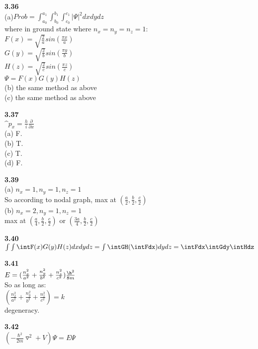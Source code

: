 \documentclass{article}
\begin{document}
\textbf{3.36}\\
(a)$Prob = \int_{a_0}^{a_1}\int_{b_0}^{b_1}\int_{c_0}^{c_1}|\Psi|^2dxdydz$\\
where in ground state where $n_x = n_y = n_z = 1$:\\
$F(x) = \sqrt{\frac{2}{a}}sin(\frac{\pi x}{a})$\\
$G(y) = \sqrt{\frac{2}{b}}sin(\frac{\pi y}{b})$\\
$H(z) = \sqrt{\frac{2}{c}}sin(\frac{\pi z}{c})$\\
$\Psi = F(x)G(y)H(z)$\\
(b) the same method as above\\
(c) the same method as above\\
\newline

\textbf{3.37}\\
$\^{p}_x = \frac{h}{i}\frac{\partial}{\partial x}$\\
(a) F.\\
(b) T.\\
(c) T.\\
(d) F.\\
\newline

\textbf{3.39}\\
(a) $n_x = 1, n_y = 1, n_z = 1$\\
So according to nodal graph, max at $(\frac{a}{2}, \frac{b}{2}, \frac{c}{2})$\\
(b) $n_x = 2, n_y = 1, n_z = 1$\\
max at $(\frac{a}{4}, \frac{b}{2}, \frac{c}{2})$ or $(\frac{3a}{4}, \frac{b}{2}, \frac{c}{2})$\\
\newline

\textbf{3.40}\\
$\int\int\intF(x)G(y)H(z)dxdydz = \int\intGH(\intFdx)dydz = \intFdx\intGdy\intHdz$\\
\newline

\textbf{3.41}\\
$E = (\frac{n_x^2}{a^2}+\frac{n_y^2}{b^2}+\frac{n_z^2}{c^2})\frac{\h^2}{8m}$\\
So as long as:\\
$(\frac{n_x^2}{a^2}+\frac{n_y^2}{b^2}+\frac{n_z^2}{c^2}) = k$\\
degeneracy.\\
\newline

\textbf{3.42}\\
$(-\frac{\hbar^2}{2m}\triangledown^2+V)\Psi = E\Psi$\\
\newline
\end{document}
